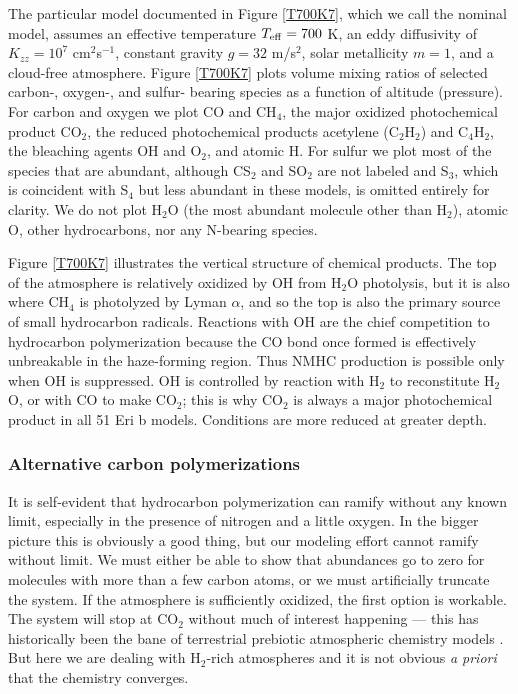 \documentclass[preprint]{aastex}
\newcounter{reaction}
\begin{document}
The particular model documented in Figure \ref{T700K7}, which we call the nominal model,
 assumes an effective temperature $T_{\rm eff}=700$ K, an eddy diffusivity of $K_{zz}=10^7$ cm$^2$s$^{-1}$,
 constant gravity $g=32$ m/s$^2$, solar metallicity $m=1$, and a cloud-free atmosphere.
Figure \ref{T700K7} plots
volume mixing ratios of selected carbon-, oxygen-, and sulfur- bearing species as a function of altitude (pressure).
For carbon and oxygen we plot CO and CH$_4$,
 the major oxidized photochemical product CO$_2$, 
 the reduced photochemical products acetylene (C$_2$H$_2$) and C$_4$H$_2$,
 the bleaching agents OH and O$_2$, and atomic H.
 For sulfur we plot most of the species that are abundant, although CS$_2$ and SO$_2$ are not
 labeled and S$_3$, which is coincident with S$_4$ but less abundant in these models, is omitted entirely for clarity. 
We do not plot H$_2$O (the most abundant molecule other than H$_2$),
atomic O, other hydrocarbons, nor any N-bearing species.

Figure \ref{T700K7} illustrates the vertical structure of chemical products. 
The top of the atmosphere is relatively oxidized by OH from H$_2$O photolysis, but it is also
where CH$_4$ is photolyzed by Lyman $\alpha$, and so the top is also the primary source of small
hydrocarbon radicals. 
Reactions with OH are the chief competition to hydrocarbon polymerization because the
 CO bond once formed is effectively unbreakable in the haze-forming region.
 Thus NMHC production is possible only when OH is suppressed. 
OH is controlled by reaction with H$_2$ to reconstitute H$_2$O, or with CO to make CO$_2$;
this is why CO$_2$ is always a major photochemical product in all 51 Eri b models.
Conditions are more reduced at greater depth. 

\subsubsection{Alternative carbon polymerizations}
\label{Results:carbon}

It is self-evident that hydrocarbon polymerization can ramify without any known limit,
especially in the presence of nitrogen and a little oxygen.
In the bigger picture this is obviously a good thing, but our modeling effort cannot ramify without limit. 
We must either be able to show that abundances go to zero for molecules with more than a few carbon atoms,
or we must artificially truncate the system.  
If the atmosphere is sufficiently oxidized, the first option is workable.
The system will stop at CO$_2$ without much of interest happening ---
this has historically been the bane of terrestrial prebiotic atmospheric chemistry models \citep[][]{Abelson1966,Pinto1980}.
But here we are dealing with H$_2$-rich atmospheres and it is not obvious {\it a priori} that the chemistry converges.
\end{document}
